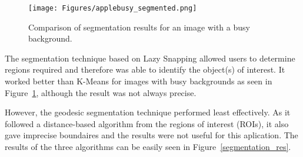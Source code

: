 \documentclass{article}
\begin{document}
\begin{figure}[H]
  \begin{minipage}[b]{1.0\linewidth}
    \centering
    \centerline{\texttt{[image: Figures/applebusy\_segmented.png]}}
  \end{minipage}
  \caption{Comparison of segmentation results for an image with a busy background.}
  \label{apple_segmented}
  \end{figure}

The segmentation technique based on Lazy Snapping allowed users to determine regions required and therefore was able to identify the object(s) of interest. It worked better than K-Means for images with busy backgrounds as seen in Figure~\ref{apple_segmented}, although the result was not always precise. 

However, the geodesic segmentation technique performed least effectively. As it followed a distance-based algorithm from the regions of interest (ROIs), it also gave imprecise boundaires and the results were not useful for this aplication. The results of the three algorithms can be easily seen in Figure~\ref{segmentation_res}.
\end{document}
